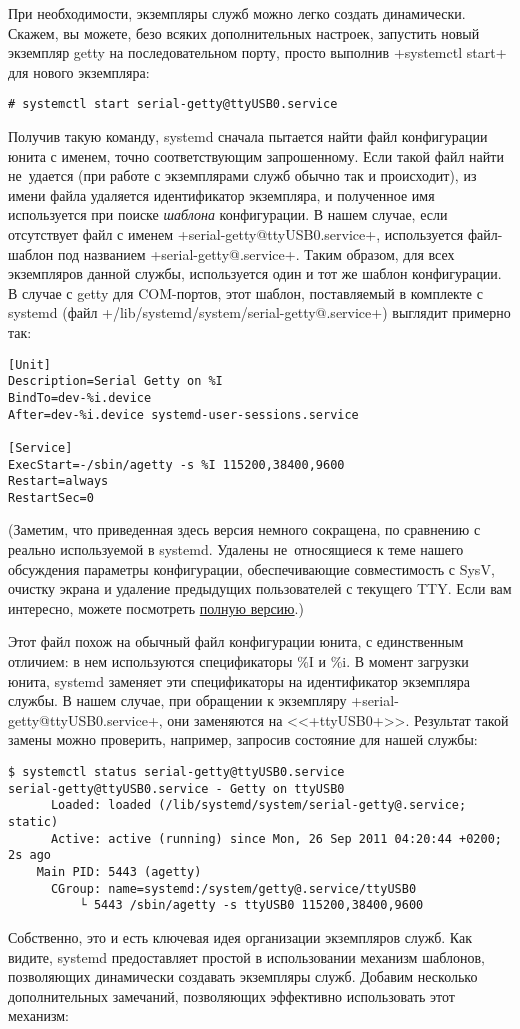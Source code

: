 \documentclass[10pt,oneside,a4paper]{article}
\begin{document}
При необходимости, экземпляры служб можно легко создать динамически. Скажем, вы
можете, безо всяких дополнительных настроек, запустить новый экземпляр getty на
последовательном порту, просто выполнив +systemctl start+ для нового экземпляра:
\begin{Verbatim}
# systemctl start serial-getty@ttyUSB0.service
\end{Verbatim}

Получив такую команду, systemd сначала пытается найти файл конфигурации юнита с
именем, точно соответствующим запрошенному. Если такой файл найти не~удается
(при работе с экземплярами служб обычно так и происходит), из имени файла
удаляется идентификатор экземпляра, и полученное имя используется при поиске
\emph{шаблона} конфигурации. В нашем случае, если отсутствует файл с именем
+serial-getty@ttyUSB0.service+, используется файл-шаблон под названием
+serial-getty@.service+. Таким образом, для всех экземпляров данной службы,
используется один и тот же шаблон конфигурации. В случае с getty для COM-портов,
этот шаблон, поставляемый в комплекте с systemd
(файл +/lib/systemd/system/serial-getty@.service+) выглядит примерно так:
\begin{Verbatim}
[Unit]
Description=Serial Getty on %I
BindTo=dev-%i.device
After=dev-%i.device systemd-user-sessions.service

[Service]
ExecStart=-/sbin/agetty -s %I 115200,38400,9600
Restart=always
RestartSec=0
\end{Verbatim}
(Заметим, что приведенная здесь версия немного сокращена, по сравнению с реально
используемой в systemd. Удалены не~относящиеся к теме нашего обсуждения
параметры конфигурации, обеспечивающие совместимость с SysV, очистку экрана и
удаление предыдущих пользователей с текущего TTY. Если вам интересно, можете
посмотреть
\href{http://cgit.freedesktop.org/systemd/systemd/plain/units/serial-getty@.service.m4}{полную
версию}.)

Этот файл похож на обычный файл конфигурации юнита, с единственным отличием: в
нем используются спецификаторы \%I и \%i. В момент загрузки юнита, systemd
заменяет эти спецификаторы на идентификатор экземпляра службы. В нашем случае,
при обращении к экземпляру +serial-getty@ttyUSB0.service+, они заменяются на
<<+ttyUSB0+>>. Результат такой замены можно проверить, например, запросив
состояние для нашей службы:
\begin{Verbatim}
$ systemctl status serial-getty@ttyUSB0.service
serial-getty@ttyUSB0.service - Getty on ttyUSB0
	  Loaded: loaded (/lib/systemd/system/serial-getty@.service; static)
	  Active: active (running) since Mon, 26 Sep 2011 04:20:44 +0200; 2s ago
	Main PID: 5443 (agetty)
	  CGroup: name=systemd:/system/getty@.service/ttyUSB0
		  └ 5443 /sbin/agetty -s ttyUSB0 115200,38400,9600
\end{Verbatim}
Собственно, это и есть ключевая идея организации экземпляров служб. Как видите,
systemd предоставляет простой в использовании механизм шаблонов, позволяющих
динамически создавать экземпляры служб. Добавим несколько дополнительных
замечаний, позволяющих эффективно использовать этот механизм:
\end{document}
